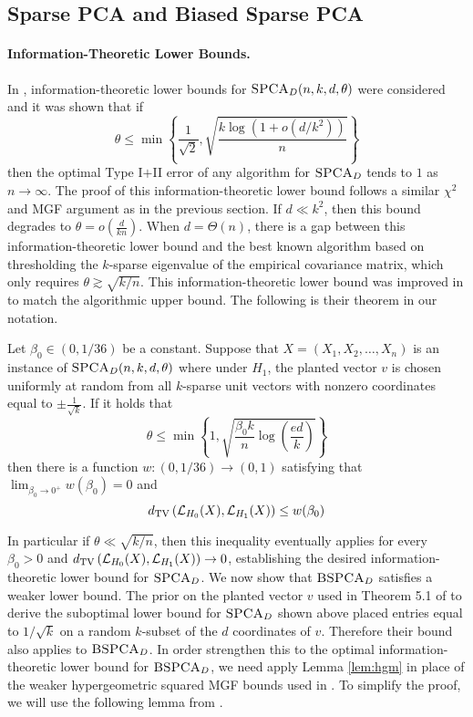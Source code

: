 \subsection{Sparse PCA and Biased Sparse PCA}

\paragraph{Information-Theoretic Lower Bounds.} In \cite{berthet2013optimal}, information-theoretic lower bounds for $\textsc{SPCA}_D(n, k, d, \theta)$ were considered and it was shown that if
$$\theta \le \min\left\{\frac{1}{\sqrt{2}}, \sqrt{\frac{k \log(1 + o(d/k^2))}{n}} \right\}$$
then the optimal Type I$+$II error of any algorithm for $\textsc{SPCA}_D$ tends to $1$ as $n \to \infty$. The proof of this information-theoretic lower bound follows a similar $\chi^2$ and MGF argument as in the previous section. If $d \ll k^2$, then this bound degrades to $\theta = o\left( \frac{d}{kn} \right)$. When $d = \Theta(n)$, there is a gap between this information-theoretic lower bound and the best known algorithm based on thresholding the $k$-sparse eigenvalue of the empirical covariance matrix, which only requires $\theta \gtrsim \sqrt{k/n}$. This information-theoretic lower bound was improved in \cite{cai2015optimal} to match the algorithmic upper bound. The following is their theorem in our notation.

\begin{theorem} \label{thm:cmw15}
Let $\beta_0 \in (0, 1/36)$ be a constant. Suppose that $X = (X_1, X_2, \dots, X_n)$ is an instance of $\textsc{SPCA}_D(n, k, d, \theta)$ where under $H_1$, the planted vector $v$ is chosen uniformly at random from all $k$-sparse unit vectors with nonzero coordinates equal to $\pm \frac{1}{\sqrt{k}}$. If it holds that
$$\theta \le \min \left\{ 1, \sqrt{\frac{\beta_0 k}{n} \log \left( \frac{ed}{k} \right)} \right\}$$
then there is a function $w : (0, 1/36) \to (0, 1)$ satisfying that $\lim_{\beta_0 \to 0^+} w(\beta_0) = 0$ and
$$d_{\text{TV}}\left( \mathcal{L}_{H_0}(X), \mathcal{L}_{H_1}(X) \right) \le w(\beta_0)$$
\end{theorem}

In particular if $\theta \ll \sqrt{k/n}$, then this inequality eventually applies for every $\beta_0 > 0$ and $d_{\text{TV}}\left( \mathcal{L}_{H_0}(X), \mathcal{L}_{H_1}(X) \right) \to 0$, establishing the desired information-theoretic lower bound for $\textsc{SPCA}_D$. We now show that $\textsc{BSPCA}_D$ satisfies a weaker lower bound. The prior on the planted vector $v$ used in Theorem 5.1 of \cite{berthet2013optimal} to derive the suboptimal lower bound for $\textsc{SPCA}_D$ shown above placed entries equal to $1/\sqrt{k}$ on a random $k$-subset of the $d$ coordinates of $v$. Therefore their bound also applies to $\textsc{BSPCA}_D$. In order strengthen this to the optimal information-theoretic lower bound for $\textsc{BSPCA}_D$, we need apply Lemma \ref{lem:hgm} in place of the weaker hypergeometric squared MGF bounds used in \cite{berthet2013optimal}. To simplify the proof, we will use the following lemma from \cite{cai2015optimal}.

